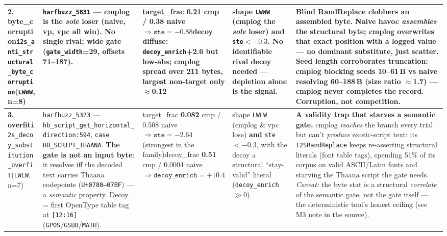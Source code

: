\documentclass[9pt]{extarticle}
\begin{document}
\begin{longtable}{>{\raggedright\arraybackslash}p{3.3cm} >{\raggedright\arraybackslash}p{3.9cm} >{\raggedright\arraybackslash}p{3.2cm} >{\raggedright\arraybackslash}p{4.1cm} >{\raggedright\arraybackslash}p{7.0cm}}
\textbf{2. byte\_corruption}\newline \texttt{i2s\_anti\_}\linebreak\texttt{structural\_}\linebreak\texttt{byte\_corruption}\newline (\texttt{LWWW}, n=8) & \texttt{harfbuzz\_5831} --- cmplog is the \emph{sole} loser (naive, vp, vpc all win). No single rival; wide gate (\texttt{gate\_width}=29, offsets 71--187). & target\_frac \textbf{0.21} cmp / 0.38 naive $\Rightarrow \texttt{ste}=\mathbf{-0.88}$\newline decoy diffuse: \texttt{decoy\_enrich}+2.6 but low-abs; cmplog spread over 211 bytes, largest non-target only $\approx$0.12 & shape \texttt{LWWW} (cmplog the \emph{sole} loser) \textbf{and} \texttt{ste}$<-0.3$. No identifiable rival decoy needed --- depletion alone is the signal. & \textbf{Blind RandReplace clobbers an assembled byte.} Naive havoc \emph{assembles} the structural byte; cmplog overwrites that exact position with a logged value --- no dominant substitute, just scatter. Seed length corroborates truncation: cmplog blocking seeds 10--61\,B vs naive resolving 60--188\,B (size ratio $\approx$1.7) --- cmplog never completes the record. Corruption, not competition. \\
\midrule
\textbf{3. overfit}\newline \texttt{i2s\_decoy\_}\linebreak\texttt{substitution\_}\linebreak\texttt{overfit}\newline (\texttt{LWLW}, n=7) & \texttt{harfbuzz\_5323} --- \texttt{hb\_script\_get\_}\linebreak\texttt{horizontal\_direction:594}, \texttt{case HB\_SCRIPT\_THAANA}. \textbf{The gate is not an input byte}: it resolves iff the decoded text carries Thaana codepoints (\texttt{U+0780--07BF}) --- a \emph{semantic} property. Decoy = first OpenType table tag at \texttt{[12:16]} (\texttt{GPOS}/\texttt{GSUB}/\texttt{MATH}). & target\_frac \textbf{0.082} cmp / 0.508 naive $\Rightarrow \texttt{ste}=\mathbf{-2.64}$ (strongest in the family)\newline decoy\_frac \textbf{0.51} cmp / 0.0004 naive $\Rightarrow \texttt{decoy\_enrich}=\mathbf{+10.4}$ & shape \texttt{LWLW} (cmplog \& vpc lose) \textbf{and} \texttt{ste}$<-0.3$, with the decoy a structural ``stay-valid'' literal (\texttt{decoy\_enrich}$\gg0$). & \textbf{A validity trap that starves a semantic gate.} cmplog \emph{reaches} the branch every trial but can't \emph{produce} exotic-script text: its \texttt{I2SRandReplace} keeps re-asserting structural literals (font table tags), spending 51\% of its corpus on valid ASCII/Latin fonts and starving the Thaana script the gate needs. \emph{Caveat:} the byte stat is a structural \emph{correlate} of the semantic gate, not the gate itself --- the deterministic tool's honest ceiling (see M3 note in the source). \\
\midrule
\end{longtable}
\end{document}
